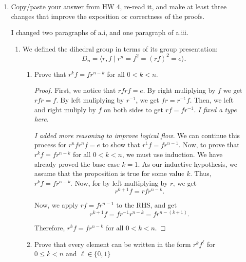 \documentclass{article}
\begin{document}
\begin{enumerate}
    \item {
    Copy/paste your answer from HW 4, re-read it, and make at least three changes that improve the exposition or correctness of the proofs.

    I changed two paragraphs of a.i, and one paragraph of a.iii.
    \begin{enumerate}
    \item {
        We defined the dihedral group in terms of its group presentation: 
        \[         D_n = \langle r, f \mid r^n = f^2 = (rf)^2 = e \rangle.       \]
      
        \begin{enumerate}
            \item {
                Prove that \(r^kf = fr^{n-k}\) for all \(0 < k < n\).

                \begin{proof}
                    First, we notice that \(rfrf = e\). By right muliplying by 
                    \(f\) we get \(rfr = f\). By left muliplying by \(r^{-1}\), 
                    we get \(fr = r^{-1}f\). Then, we left and right muliply by 
                    \(f\) on both sides to get \(rf = fr^{-1}\).
                    \emph{I fixed a type here.}

                    \emph{I added more reasoning to improve logical flow.}
                    We can continue this process for \(r^n f r^n f = e\) to show 
                    that \(r^1f = fr^{n-1}\). Now, to prove that 
                    \(r^kf = fr^{n-k}\) for all \(0 < k < n\), we must use 
                    induction. We have already proved the base case \(k = 1\). 
                    As our inductive hypothesis, we assume that the proposition 
                    is true for some value \(k\). Thus, \(r^kf = fr^{n-k}\).
                    Now, for by left multiplying by \(r\), we get 
                    \[r^{k+1}f = rfr^{n-k}.\]

                    Now, we apply \(rf = fr^{n-1}\) to the RHS, and get 
                    \[r^{k+1}f = fr^{-1}r^{n-k} = fr^{n- (k+1)}.\]
                    
                    Therefore, \(r^kf = fr^{n-k}\) for all \(0 < k < n\).
                \end{proof}
            }
            \item {
                Prove that every element can be written in the form \(r^kf^\ell\) 
                for \(0 \leq k < n\) and \(\ell \in \{0, 1\}\)

}
\end{enumerate}}
\end{enumerate}}
\end{enumerate}
\end{document}
